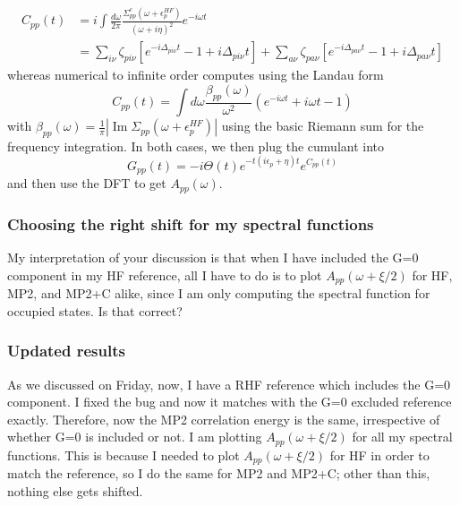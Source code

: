 \begin{align}
	 C_{pp}(t) &= i \int \frac{d\omega}{2\pi} \frac{ \Sigma_{pp}^c\left(\omega+\epsilon_p^{HF}\right)}{(\omega + i \eta)^2} e^{-i \omega t}
\label{eq:Cpp_0} \\
&= \sum_{i\nu} \zeta_{pi\nu} \left[ e^{-i\Delta_{pi\nu} t} - 1 + i\Delta_{pi\nu} t \right] + \sum_{a\nu} \zeta_{pa\nu} \left[ e^{-i\Delta_{pa\nu} t} - 1 + i\Delta_{pa\nu} t \right]
\label{eq:Cpp_2}
\end{align}
whereas numerical to infinite order computes using the Landau form
\begin{equation}
    C_{pp}(t) = \int d \omega \frac{\beta_{pp}(\omega)}{\omega^2} \left( e^{-i \omega t} + i \omega t -1 \right)
\label{eq:cumulant_beta_repeat}
\end{equation}
with $\beta_{pp}(\omega) = \frac{1}{\pi} |\operatorname{Im} \Sigma_{pp}(\omega + \epsilon_p^{HF})|$ using the basic Riemann sum for the frequency integration. In both cases, we then plug the cumulant into
\begin{equation}
    G_{pp}(t) = -i \Theta(t) e^{-t \left(i\epsilon_p + \eta\right)t} e^{C_{pp}(t)}
\end{equation}
and then use the DFT to get $A_{pp}(\omega)$.
\subsubsection{Choosing the right shift for my spectral functions}
My interpretation of your discussion is that when I have included the G=0 component in my HF reference, all I have to do is to plot $A_{pp}(\omega+\xi/2)$ for HF, MP2, and MP2+C alike, since I am only computing the spectral function for occupied states. Is that correct?
\subsubsection{Updated results}
As we discussed on Friday, now, I have a RHF reference which includes the G=0 component. I fixed the bug and now it matches with the G=0 excluded reference exactly. Therefore, now the MP2 correlation energy is the same, irrespective of whether G=0 is included or not. I am plotting $A_{pp}(\omega+\xi/2)$ for all my spectral functions. This is because I needed to plot $A_{pp}(\omega+\xi/2)$ for HF in order to match the reference, so I do the same for MP2 and MP2+C; other than this, nothing else gets shifted. 
